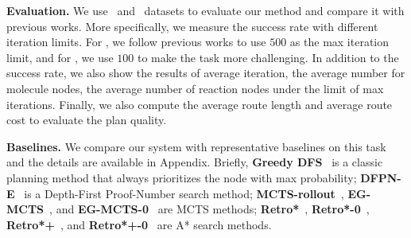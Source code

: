 \documentclass[sigconf]{acmart}
\begin{document}
\noindent\textbf{Evaluation.}
We use \uspto~and \usptoext~datasets to evaluate our method and compare it with previous works.
More specifically, we measure the success rate with different iteration limits.
For \uspto, we follow previous works to use $500$ as the max iteration limit, and for \usptoext, we use $100$ to make the task more challenging.
In addition to the success rate, we also show the results of average iteration, the average number for molecule nodes, the average number of reaction nodes under the limit of max iterations.
Finally, we also compute the average route length and average route cost to evaluate the plan quality.


\noindent\textbf{Baselines.}
We compare our system with representative baselines on this task and the details are available in Appendix.
Briefly, \textbf{Greedy DFS}~\citep{Hong2021} is a classic planning method that always prioritizes the node with max probability; 
\textbf{DFPN-E}~\citep{kishimoto2019depth} is a Depth-First Proof-Number search method; 
\textbf{MCTS-rollout}~\citep{Hong2021}, \textbf{EG-MCTS}~\citep{Hong2021}, and  \textbf{EG-MCTS-0}~\citep{Hong2021} are MCTS methods;
\textbf{Retro*}~\citep{Chen2020}, \textbf{Retro*-0}~\citep{Chen2020}, \textbf{Retro*+}~\cite{Kim2021}, and \textbf{Retro*+-0}~\cite{Kim2021} are A* search methods.
\end{document}
